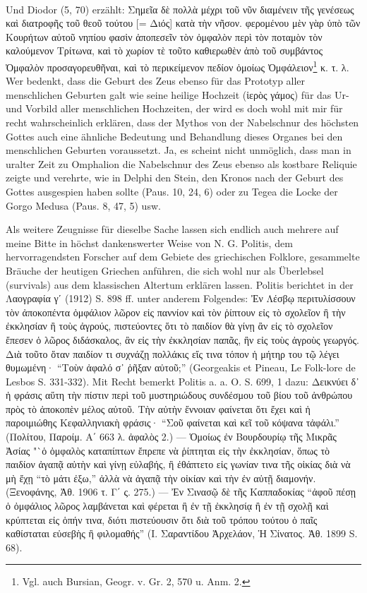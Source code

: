 \documentclass[a4paper, 11pt, oneside]{article}
\begin{document}
\paragraph{}
Und Diodor (5, 70) erzählt: Σημεῖα δὲ πολλὰ μέχρι τοῦ νῦν διαμένειν τῆς γενέσεως καὶ διατροφῆς τοῦ θεοῦ τούτου [= Διός] κατὰ τὴν νῆσον. φερομένου μὲν γὰρ ὑπὸ τῶν Κουρήτων αὐτοῦ νηπίου φασὶν ἀποπεσεῖν τὸν ὀμφαλὸν περὶ τὸν ποταμὸν τὸν καλούμενον Τρίτωνα, καὶ τὸ χωρίον τὲ τοῦτο καθιερωθὲν ἀπὸ τοῦ συμβάντος Ὀμφαλὸν προσαγορευθῆναι, καὶ τὸ περικείμενον πεδίον ὁμοίως Ὀμφάλειον\footnote{Vgl. auch Bursian, Geogr. v. Gr. 2, 570 u. Anm. 2.} κ. τ. λ. Wer bedenkt, dass die Geburt des Zeus ebenso für das Prototyp aller menschlichen Geburten galt wie seine heilige Hochzeit (ἱερὸς γάμος) für das Ur- und Vorbild aller menschlichen Hochzeiten, der wird es doch wohl mit mir für recht wahrscheinlich erklären, dass der Mythos von der Nabelschnur des höchsten Gottes auch eine ähnliche Bedeutung und Behandlung dieses Organes bei den menschlichen Geburten voraussetzt. Ja, es scheint nicht unmöglich, dass man in uralter Zeit zu Omphalion die Nabelschnur des Zeus ebenso als kostbare Reliquie zeigte und verehrte, wie in Delphi den Stein, den Kronos nach der Geburt des Gottes ausgespien haben sollte (Paus. 10, 24, 6) oder zu Tegea die Locke der Gorgo Medusa (Paus. 8, 47, 5) usw.

Als weitere Zeugnisse für dieselbe Sache lassen sich endlich auch mehrere auf meine Bitte in höchst dankenswerter Weise von N. G. Politis, dem hervorragendsten Forscher auf dem Gebiete des griechischen Folklore, gesammelte Bräuche der heutigen Griechen anführen, die sich wohl nur als Überlebsel (survivals) aus dem klassischen Altertum erklären lassen. Politis berichtet in der Λαογραφία γʹ (1912) S. 898 ff. unter anderem Folgendes: Ἐν Λέσβῳ περιτυλίσσουν τὸν ἀποκοπέντα ὀμφάλιον λῶρον εἰς παννίον καὶ τὸν ῥίπτουν εἰς τὸ σχολεῖον ἢ τὴν ἐκκλησίαν ἢ τοὺς ἀγρούς, πιστεύοντες ὅτι τὸ παιδίον θὰ γίνῃ ἂν εἰς τὸ σχολεῖον ἔπεσεν ὁ λῶρος διδάσκαλος, ἂν εἰς τὴν ἐκκλησίαν παπᾶς, ἢν εἰς τοὺς ἀγροὺς γεωργός. Διὰ τοῦτο ὅταν παιδίον τι συχνάζῃ πολλάκις εἴς τινα τόπον ἡ μήτηρ του τῷ λέγει θυμωμένη· "`Τοὺν ἀφαλό σ᾽ ῥῆξαν αὐτοῦ;"' (Georgeakis et Pineau, Le Folk-lore de Lesbos S. 331-332). Mit Recht bemerkt Politis a. a. O. S. 699, 1 dazu: Δεικνύει δ᾽ ἡ φράσις αὕτη τὴν πίστιν περὶ τοῦ μυστηριώδους συνδέσμου τοῦ βίου τοῦ ἀνθρώπου πρὸς τὸ ἀποκοπὲν μέλος αὐτοῦ. Τὴν αὐτὴν ἔννοιαν φαίνεται ὅτι ἔχει καὶ ἡ παροιμιώθης Κεφαλληνιακὴ φράσις· "`Σοῦ φαίνεται καὶ κεῖ τοῦ κόψανα τἀφάλι."' (Πολίτου, Παροίμ. Α΄ 663 λ. ἀφαλὸς 2.) --- Ὁμοίως ἐν Βουρδουρίῳ τῆς Μικρᾶς Ἀσίας "`ὁ ὀμφαλὸς καταπίπτων ἔπρεπε νὰ ῥίπτηται εἰς τὴν ἐκκλησίαν, ὅπως τὸ παιδίον ἀγαπᾷ αὐτὴν καὶ γίνῃ εὐλαβής, ἣ ἐθάπτετο εἰς γωνίαν τινα τῆς οἰκίας διὰ νὰ μὴ ἔχῃ "`τὸ μάτι ἐξω,"' ἀλλὰ νὰ ἀγαπᾷ τὴν οἰκίαν καὶ τὴν ἐν αὐτῇ διαμονήν. (Ξενοφάνης, Ἀθ. 1906 τ. Γ΄ ς. 275.) --- Ἐν Σινασῷ δὲ τῆς Καππαδοκίας "`ἀφοῦ πέσῃ ὁ ὀμφάλιος λῶρος λαμβάνεται καὶ φέρεται ἢ ἐν τῇ ἐκκλησίᾳ ἢ ἐν τῇ σχολῇ καὶ κρύπτεται εἰς ὁπήν τινα, διότι πιστεύουσιν ὅτι διὰ τοῦ τρόπου τούτου ὁ παῖς καθίσταται εὐσεβὴς ἢ φιλομαθής"' (Ι. Σαραντίδου Ἀρχελάον, Ἡ Σίνατος. Ἀθ. 1899 S. 68).
\end{document}
